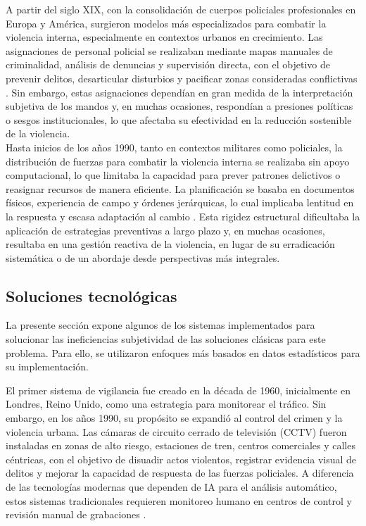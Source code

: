 A partir del siglo XIX, con la consolidación de cuerpos 
policiales profesionales en Europa y América, surgieron 
modelos más especializados para combatir la violencia 
interna, especialmente en contextos urbanos en crecimiento. 
Las asignaciones de personal policial se realizaban mediante 
mapas manuales de criminalidad, análisis de denuncias y 
supervisión directa, con el objetivo de prevenir delitos, 
desarticular disturbios y pacificar zonas consideradas 
conflictivas \cite{Emsley2007}. Sin embargo, estas asignaciones 
dependían en gran medida de la interpretación subjetiva 
de los mandos y, en muchas ocasiones, respondían a presiones 
políticas o sesgos institucionales, lo que afectaba 
su efectividad en la reducción sostenible de la violencia.\\

Hasta inicios de los años 1990, tanto en contextos militares 
como policiales, la distribución de fuerzas para combatir 
la violencia interna se realizaba sin apoyo computacional, 
lo que limitaba la capacidad para prever patrones delictivos 
o reasignar recursos de manera eficiente. La planificación 
se basaba en documentos físicos, experiencia de campo y 
órdenes jerárquicas, lo cual implicaba lentitud en la 
respuesta y escasa adaptación al cambio \cite{sheptycki1998}. 
Esta rigidez estructural dificultaba la aplicación de 
estrategias preventivas a largo plazo y, en muchas ocasiones, 
resultaba en una gestión reactiva de la violencia, en lugar 
de su erradicación sistemática o de un abordaje desde 
perspectivas más integrales. \\

\subsection{Soluciones tecnológicas}\label{solucionesTecnologicas}

La presente sección expone algunos de los sistemas implementados 
para solucionar las ineficiencias subjetividad de las soluciones 
clásicas para este problema. Para ello, se utilizaron enfoques 
más basados en datos estadísticos para su implementación. 

El primer sistema de vigilancia fue creado en la década de 
1960, inicialmente en Londres, Reino Unido, como una 
estrategia para monitorear el tráfico. Sin embargo, en los 
años 1990, su propósito se expandió al control del crimen y 
la violencia urbana. Las cámaras de circuito cerrado de 
televisión (CCTV) fueron instaladas en zonas de alto riesgo, 
estaciones de tren, centros comerciales y calles céntricas, con 
el objetivo de disuadir actos violentos, registrar evidencia 
visual de delitos y mejorar la capacidad de respuesta de las 
fuerzas policiales. A diferencia de las tecnologías modernas 
que dependen de IA para el análisis automático, estos 
sistemas tradicionales requieren monitoreo humano en centros 
de control y revisión manual de grabaciones \cite{Vilalta2019}.\\


